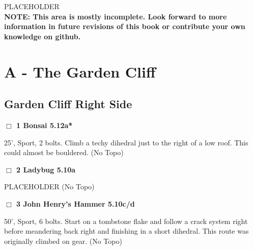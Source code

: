 \begin{multicols}{2}



PLACEHOLDER\\

\textbf{NOTE: This area is mostly incomplete. Look forward to more information in future revisions of this book or contribute your own knowledge on github.}\\


\newpage

\section{A - The Garden Cliff}\label{sa:The Garden Cliff}




\needspace{1.5cm}
\subsection*{Garden Cliff Right Side}\label{bf:Garden Cliff Right Side}
	


\needspace{1.5cm}
\label{rt:Bonsai}
\colorbox{Goldenrod!20}{
\parbox{0.95\linewidth}{
\hspace{-1ex}\textbf{$\Box$
1 Bonsai 5.12a*  
}}}
\begin{adjustwidth}{1.3em}{}			
25', Sport, 2 bolts. Climb a techy dihedral just to the right of a low roof. This could almost be bouldered.
  (No Topo)
\end{adjustwidth}




\needspace{1.5cm}
\label{rt:Ladybug}
\colorbox{RoyalBlue!20}{
\parbox{0.95\linewidth}{
\hspace{-1ex}\textbf{$\Box$
2 Ladybug 5.10a  
}}}
\begin{adjustwidth}{1.3em}{}			
PLACEHOLDER
  (No Topo)
\end{adjustwidth}




\needspace{1.5cm}
\label{rt:John Henry's Hammer}
\colorbox{RoyalBlue!20}{
\parbox{0.95\linewidth}{
\hspace{-1ex}\textbf{$\Box$
3 John Henry's Hammer 5.10c/d  
}}}
\begin{adjustwidth}{1.3em}{}			
50', Sport, 6 bolts. Start on a tombstone flake and follow a crack system right before meandering back right and finishing in a short dihedral. This route was originally climbed on gear.
  (No Topo)
\end{adjustwidth}



\end{multicols}
